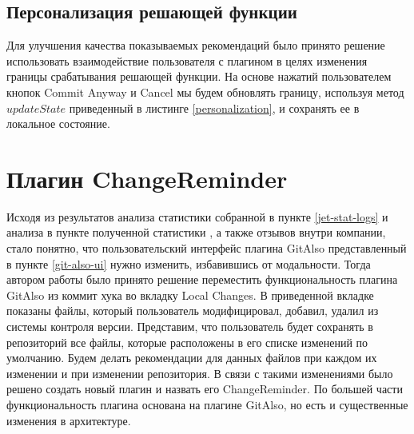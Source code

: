\documentclass[times]{itmo-student-thesis}
\begin{document}
\subsection{Персонализация решающей функции}
Для улучшения качества показываемых рекомендаций было принято решение использовать взаимодействие пользователя с плагином в целях изменения границы срабатывания решающей функции. На основе нажатий пользователем кнопок Commit Anyway и Cancel мы будем обновлять границу, используя метод $updateState$ приведенный в листинге \ref{personalization}, и сохранять ее в локальное состояние.
\section{Плагин ChangeReminder}
Исходя из результатов анализа статистики собранной в пункте \ref{jet-stat-logs} и анализа в пункте полученной статистики
, а также отзывов внутри компании, стало понятно, что пользовательский интерфейс плагина GitAlso представленный в пункте \ref{git-also-ui} нужно изменить, избавившись от модальности. Тогда автором работы было принято решение переместить функциональность плагина GitAlso из коммит хука во вкладку Local Changes. В приведенной вкладке показаны файлы, который пользователь модифицировал, добавил, удалил из системы контроля версии. Представим, что пользователь будет сохранять в репозиторий все файлы, которые расположены в его списке изменений по умолчанию. Будем делать рекомендации для данных файлов при каждом их изменении и при изменении репозитория. В связи с такими изменениями было решено создать новый плагин и назвать его ChangeReminder. По большей части функциональность плагина основана на плагине GitAlso, но есть и существенные изменения в архитектуре.
\end{document}
